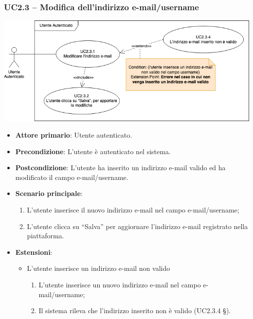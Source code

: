 \subsubsection{UC2.3 – Modifica dell'indirizzo e-mail/username}
\begin{center}
\includegraphics[scale=0.5]{UC_images/UC2_3.png}
\end{center}
\begin{itemize}
\item \textbf{Attore primario}: Utente autenticato.
\item \textbf{Precondizione}: L’utente è autenticato nel sistema.
\item \textbf{Postcondizione}: L’utente ha inserito un indirizzo e-mail valido ed ha modificato il campo e-mail/username.

\item \textbf{Scenario principale}:
\begin{enumerate}
\item L’utente inserisce il nuovo indirizzo e-mail nel campo e-mail/username;
\item L’utente clicca su “Salva” per aggiornare l'indirizzo e-mail registrato nella piattaforma.
\end{enumerate}

\item \textbf{Estensioni}:
\begin{itemize}
\item L’utente inserisce un indirizzo e-mail non valido
\begin{enumerate}
	\item L’utente inserisce un nuovo indirizzo e-mail nel campo e-mail/username;
	\item Il sistema rileva che l’indirizzo inserito non è valido (UC2.3.4 §).
\end{enumerate}
\end{itemize}
\end{itemize}

